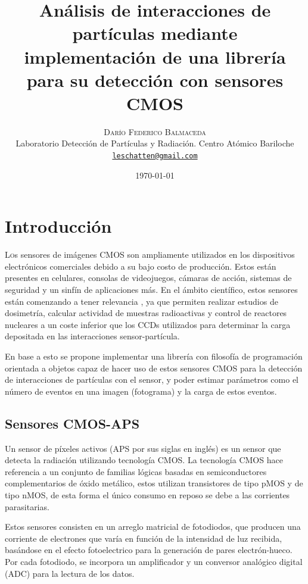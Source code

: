 \documentclass[twoside,twocolumn]{article}
\title{Análisis de interacciones de partículas mediante implementación de una librería para su detección con sensores CMOS}
\author{%
    \textsc{Darío Federico Balmaceda} \\[1ex]     %
    \normalsize Laboratorio Detección de Partículas y Radiación. Centro Atómico Bariloche \\        %
    \normalsize \href{mailto:leschatten@gmail.com}{\texttt{leschatten@gmail.com}}                   %
  }
\date{\today}
\begin{document}
  
  \maketitle              %
  
  \section{Introducción}\label{sec:intro}
    \lettrine[nindent=0em,lines=3]{L}os sensores de imágenes CMOS son ampliamente utilizados en los dispositivos electrónicos comerciales
    debido a su bajo costo de producción. Estos están presentes en celulares, consolas de videojuegos, cámaras de acción,
    sistemas de seguridad y un sinfín de aplicaciones más.
    En el ámbito científico, estos sensores están comenzando a tener relevancia \cite{PerezCMOS},
    ya que permiten realizar estudios de dosimetría, calcular actividad de muestras radioactivas y control de reactores nucleares
    a un coste inferior que los CCDs utilizados para determinar la carga depositada en las interacciones sensor-partícula. %

    En base a esto se propone implementar una librería con filosofía de programación orientada a objetos
    capaz de hacer uso de estos sensores CMOS para la detección de interacciones de partículas con el sensor,
    y poder estimar parámetros como el número de eventos en una imagen (fotograma) y la carga de estos eventos.

    \subsection{Sensores CMOS-APS}\label{sec:intro:CMOS_sensor}
      Un sensor de píxeles activos (APS por sus siglas en inglés) es un sensor que detecta la radiación utilizando tecnología CMOS.
      La tecnología CMOS hace referencia a un conjunto de familias lógicas basadas en semiconductores complementarios de óxido metálico,
      estos utilizan transistores de tipo pMOS y de tipo nMOS, de esta forma el único consumo en reposo se debe a las corrientes parasitarias.

      Estos sensores consisten en un arreglo matricial de fotodiodos,
      que producen una corriente de electrones que varía en función de la intensidad de luz recibida,
      basándose en el efecto fotoelectrico para la generación de pares electrón-hueco.
      Por cada fotodiodo, se incorpora un amplificador y un conversor analógico digital (ADC) para la lectura de los datos.
\end{document}
